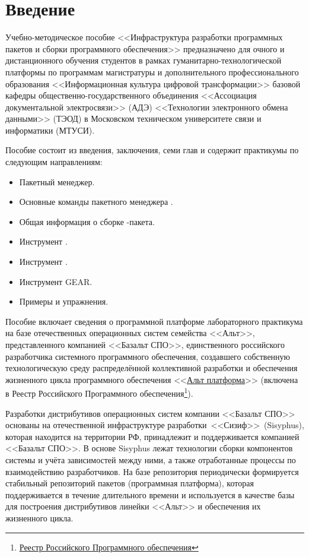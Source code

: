 \chapter*{Введение}

Учебно-методическое пособие <<Инфраструктура разработки программных пакетов и сборки 
программного обеспечения>> предназначено для очного и дистанционного обучения студентов 
в рамках гуманитарно-технологической платформы по программам магистратуры и 
дополнительного профессионального образования <<Информационная культура цифровой 
трансформации>> базовой кафедры общественно-государственного объединения <<Ассоциация 
документальной электросвязи>> (АДЭ) <<Технологии электронного обмена данными>> (ТЭОД) 
в Московском техническом университете связи и информатики (МТУСИ). 

Пособие состоит из введения, заключения, семи глав и содержит практикумы по следующим направлениям:
\begin{itemize}
	\item Пакетный менеджер.
	\item Основные команды пакетного менеджера .
	\item Общая информация о сборке -пакета.
	\item Инструмент .
	\item Инструмент .
	\item Инструмент GEAR.
	\item Примеры и упражнения.
\end{itemize}

Пособие включает сведения о программной платформе лабораторного практикума на базе 
отечественных операционных систем семейства <<Альт>>, представленного компанией <<Базальт СПО>>, 
единственного российского разработчика системного программного обеспечения, создавшего 
собственную технологическую среду распределённой коллективной разработки и обеспечения 
жизненного цикла программного обеспечения <<\href{https://www.basealt.ru/alt-platform}{Альт платформа}>> 
(включена в Реестр Российского Программного обеспечения\footnote{\href{https://reestr.digital.gov.ru}{Реестр Российского Программного обеспечения}}).

Разработки дистрибутивов операционных систем компании <<Базальт СПО>> основаны на 
отечественной инфраструктуре разработки <<Сизиф>> (Sisyphus), которая находится на 
территории РФ, принадлежит и поддерживается компанией <<Базальт СПО>>. В основе 
Sisyphus лежат технологии сборки компонентов системы и учёта зависимостей между ними, а
также отработанные процессы по взаимодействию разработчиков. На базе репозитория
периодически формируется стабильный репозиторий пакетов (программная платформа), которая поддерживается
в течение длительного времени и используется в качестве базы для построения дистрибутивов 
линейки <<Альт>> и обеспечения их жизненного цикла.

